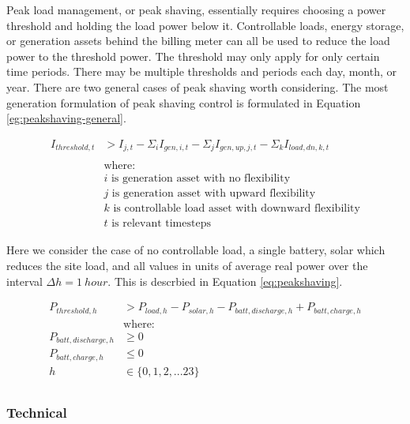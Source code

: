 \documentclass[journal,article,submit,pdftex,moreauthors]{Definitions/mdpi}
\begin{document}
Peak load management, or peak shaving, essentially requires choosing a
power threshold and holding the load power below it. Controllable loads,
energy storage, or generation assets behind the billing meter can all be
used to reduce the load power to the threshold power. The threshold may
only apply for only certain time periods. There may be multiple
thresholds and periods each day, month, or year. There are two general
cases of peak shaving worth considering. The most generation formulation
of peak shaving control is formulated in Equation \ref{eg:peakshaving-general}.

\begin{equation}
  \label{eg:peakshaving-general}
  \begin{split}
    I_{threshold,t} &> I_{j,t} - \Sigma_i I_{gen,i,t} - \Sigma_j I_{gen,up,j,t} - \Sigma_k I_{load,dn,k,t}  \\
    \\
    &\text{where:} \\
    &i\text{ is generation asset with no flexibility} \\
    &j\text{ is generation asset with upward flexibility} \\
    &k\text{ is controllable load asset with downward flexibility} \\
    &t\text{ is relevant timesteps}
  \end{split}
\end{equation}

Here we consider the case of no controllable load, a single battery,
solar which reduces the site load, and all values in units of average
real power over the interval \(\Delta h = 1\ hour\). This is descrbied in Equation \ref{eq:peakshaving}.

\begin{equation}
  \label{eq:peakshaving}
  \begin{split}
    P_{threshold,h} &> P_{load,h} - P_{solar,h} - P_{batt,discharge,h} + P_{batt,charge,h}   \\
    &\text{where:} \\
    P_{batt,discharge,h} &\ge 0 \\
    P_{batt,charge,h} &\le 0 \\
    h &\in \{0,1,2,...23\} \\
  \end{split}
\end{equation}

\subsubsection{Technical}\label{technical}%
\end{document}
